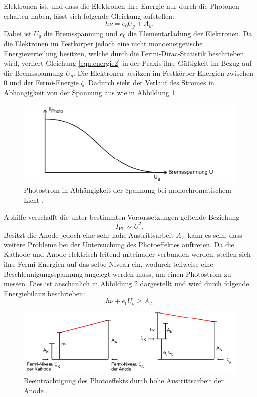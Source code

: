 Elektronen ist, und dass die Elektronen ihre Energie nur durch die Photonen erhalten haben, lässt sich folgende Gleichung aufstellen:
\begin{equation}
  h \nu = e_0 U_g + A_k .
  \label{eqn:energie2}
\end{equation}
Dabei ist $U_g$ die Bremsspannung und $e_0$ die Elementarladung der Elektronen.
Da die Elektronen im Festkörper jedoch eine nicht monoenergetische Energieverteilung besitzen, welche durch die Fermi-Dirac-Statistik beschrieben wird, verliert Gleichung \eqref{eqn:energie2} in der Praxis ihre Gültigkeit im Bezug auf
die Bremsspannung $U_g$. Die Elektronen besitzen im Festkörper Energien zwischen $0$ und der Fermi-Energie $\zeta$.
Dadurch sieht der Verlauf des Stromes in Abhängigkeit von der Spannung aus wie in Abbildung \ref{fig:iu}.
\begin{figure}
  \centering
  \includegraphics{images/iu.png}
  \caption{Photostrom in Abhängigkeit der Spannung bei monochromatischem Licht \cite[77]{sample}.}
  \label{fig:iu}
\end{figure}
Abhilfe verschafft die unter bestimmten Voraussetzungen geltende Beziehung
\begin{equation}
  I_\text{Ph} \sim U^2 .
  \label{eqn:ipropu}
\end{equation}
Besitzt die Anode jedoch eine sehr hohe Austrittsarbeit $A_A$ kann es sein, dass weitere Probleme bei der Untersuchung des Photoeffektes auftreten. Da die Kathode und Anode elektrisch leitend miteinader verbunden werden, stellen sich ihre
Fermi-Energien auf das selbe Niveau ein, wodurch teilweise eine Beschleunigungsspannung angelegt werden muss, um einen Photostrom zu messen. Dies ist anschaulich in Abbildung \ref{fig:AA} dargestellt und wird durch folgende Energiebilanz
beschrieben:
\begin{equation}
  h \nu + e_0 U_b \geq A_A
  \label{eqn:energie3}
\end{equation}
\begin{figure}
  \centering
  \includegraphics{images/AA.png}
  \caption{Beeinträchtigung des Photoeffekts durch hohe Austrittsarbeit der Anode \cite[78]{sample}.}
  \label{fig:AA}
\end{figure}
